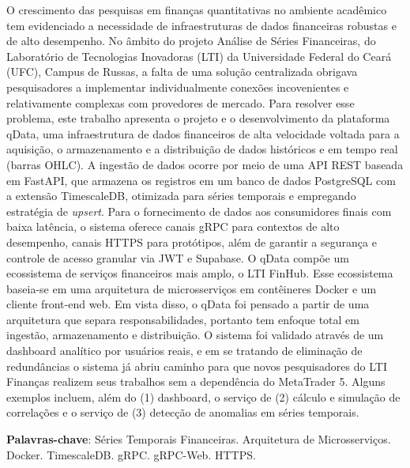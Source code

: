 \setlength{\absparsep}{18pt} %
\begin{resumo}
O crescimento das pesquisas em finanças quantitativas no ambiente acadêmico tem evidenciado a necessidade de infraestruturas de dados financeiras robustas e de alto desempenho. No âmbito do projeto Análise de Séries Financeiras, do Laboratório de Tecnologias Inovadoras (LTI) da Universidade Federal do Ceará (UFC), Campus de Russas, a falta de uma solução centralizada obrigava pesquisadores a implementar individualmente conexões incovenientes e relativamente complexas com provedores de mercado. Para resolver esse problema, este trabalho apresenta o projeto e o desenvolvimento da plataforma qData, uma infraestrutura de dados financeiros de alta velocidade voltada para a aquisição, o armazenamento e a distribuição de dados históricos e em tempo real (barras OHLC). A ingestão de dados ocorre por meio de uma API REST baseada em FastAPI, que armazena os registros em um banco de dados PostgreSQL com a extensão TimescaleDB, otimizada para séries temporais e empregando estratégia de \textit{upsert}. Para o fornecimento de dados aos consumidores finais com baixa latência, o sistema oferece canais gRPC para contextos de alto desempenho, canais HTTPS para protótipos, além de garantir a segurança e controle de acesso granular via JWT e Supabase. O qData compõe um ecossistema de serviços financeiros mais amplo, o LTI FinHub. Esse ecossistema baseia-se em uma arquitetura de microsserviços em contêineres Docker e um cliente front-end web. Em vista disso, o qData foi pensado a partir de uma arquitetura que separa responsabilidades, portanto tem enfoque total em ingestão, armazenamento e distribuição. O sistema foi validado através de um dashboard analítico por usuários reais, e em se tratando de eliminação de redundâncias o sistema já abriu caminho para que novos pesquisadores do LTI Finanças realizem seus trabalhos sem a dependência do MetaTrader 5. Alguns exemplos incluem, além do (1) dashboard, o serviço de (2) cálculo e simulação de correlações e o serviço de (3) detecção de anomalias em séries temporais.

 \textbf{Palavras-chave}: Séries Temporais Financeiras. Arquitetura de Microsserviços. Docker. TimescaleDB. gRPC. gRPC-Web. HTTPS.
\end{resumo}
